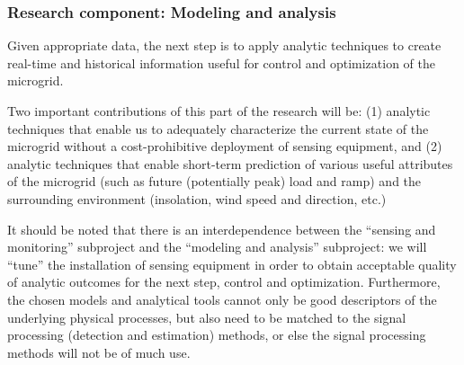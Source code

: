 
\subsubsection{Research component: Modeling and analysis}
\label{sec:modeling}

Given appropriate data, the next step is to apply analytic techniques to
create real-time and historical information useful for control and
optimization of the microgrid.

Two important contributions of this part of the research will be: (1)
analytic techniques that enable us to adequately characterize the current
state of the microgrid without a cost-prohibitive deployment of sensing
equipment, and (2) analytic techniques that enable short-term prediction of
various useful attributes of the microgrid (such as future (potentially
peak) load and ramp) and the surrounding environment (insolation, wind
speed and direction, etc.)

It should be noted that there is an interdependence between the ``sensing
and monitoring'' subproject and the ``modeling and analysis'' subproject:
we will ``tune'' the installation of sensing equipment in order to obtain
acceptable quality of analytic outcomes for the next step, control and
optimization. Furthermore, the chosen models and analytical tools cannot
only be good descriptors of the underlying physical processes, but also
need to be matched to the signal processing (detection and estimation)
methods, or else the signal processing methods will not be of much use.


